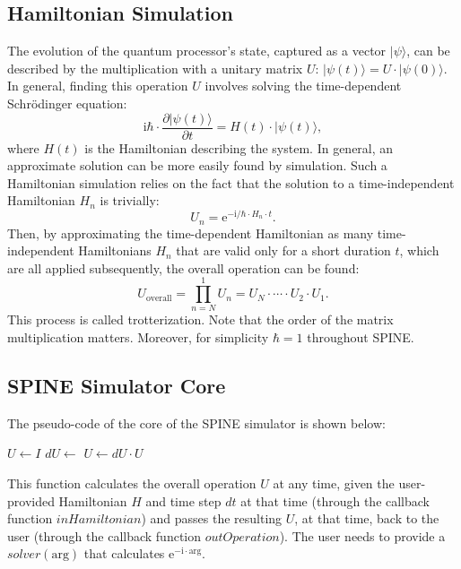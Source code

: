 \documentclass[10pt,a4paper,onecolumn,notitlepage]{article}
\begin{document}
\subsection{Hamiltonian Simulation}
The evolution of the quantum processor's state, captured as a vector $|\psi\rangle$, can be described by the multiplication with a unitary matrix $U$: $|\psi(t)\rangle = U \cdot |\psi(0)\rangle$. In general, finding this operation $U$ involves solving the time-dependent Schr\"{o}dinger equation:
\begin{equation}
\mathrm{i} \hbar \cdot \frac{\partial|\psi(t)\rangle}{\partial t} = H(t) \cdot |\psi(t)\rangle,
\end{equation}
where $H(t)$ is the Hamiltonian describing the system. In general, an approximate solution can be more easily found by simulation. Such a Hamiltonian simulation relies on the fact that the solution to a time-independent Hamiltonian $H_n$ is trivially:
\begin{equation}
U_n = \mathrm{e}^{-\mathrm{i}/\hbar \cdot H_n \cdot t}.
\end{equation}
Then, by approximating the time-dependent Hamiltonian as many time-independent Hamiltonians $H_n$ that are valid only for a short duration $t$, which are all applied subsequently, the overall operation can be found:
\begin{equation}
U_{\mathrm{overall}} = \prod_{n=N}^{1} U_n = U_N \cdot \cdots \cdot U_2 \cdot U_1.
\end{equation}
This process is called trotterization. Note that the order of the matrix multiplication matters. Moreover, for simplicity $\hbar = 1$ throughout SPINE.

\subsection{SPINE Simulator Core}
The pseudo-code of the core of the SPINE simulator is shown below:
\begin{algorithmic}
	\State $U\gets I$
		\State $dU \gets$ 
		\State $U \gets dU \cdot U$
		\State {}
	\EndWhile
\EndFunction
\end{algorithmic}
This function calculates the overall operation $U$ at any time, given the user-provided Hamiltonian $H$ and time step $dt$ at that time (through the callback function $\mathit{inHamiltonian}$) and passes the resulting $U$, at that time, back to the user (through the callback function $\mathit{outOperation}$). The user needs to provide a $\mathit{solver}(\mathrm{arg})$ that calculates $\mathrm{e}^{-\mathrm{i} \cdot \mathrm{arg}}$.
\end{document}
